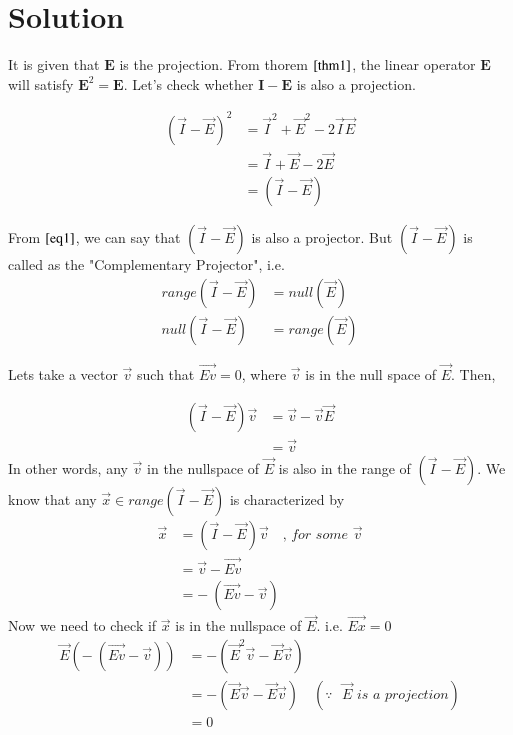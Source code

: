 \documentclass[journal,12pt,twocolumn]{IEEEtran}
\begin{document}
	\section{\textbf{Solution}}
	
	It is given that $\mathbf{E}$ is the projection. From thorem $\ref{thm1}$, the linear operator $\mathbf{E}$ will satisfy $\mathbf{E}^{2} = \mathbf{E}$. Let's check whether $\mathbf{I-E}$ is also a projection. 
	
	\begin{align}\label{eq1}
		(\Vec{I}-\vec{E})^{2} &= \Vec{I}^{2} + \Vec{E}^{2} - 2\Vec{I}\Vec{E} \nonumber \\
		&= \Vec{I} + \Vec{E} - 2\Vec{E} \nonumber \\
		&= (\Vec{I} - \Vec{E})
	\end{align}
	
	From $\eqref{eq1}$, we can say that $(\Vec{I} - \Vec{E})$ is also a projector. But $(\Vec{I} - \Vec{E})$ is called as the "Complementary Projector", i.e.
	\begin{align}
		range(\Vec{I} - \Vec{E}) &= null(\Vec{E}) \label{eq2}\\
		null(\Vec{I} - \Vec{E}) &= range(\Vec{E}) \label{eq3}
	\end{align}
	
	Lets take a vector $\Vec{v}$ such that $\Vec{Ev} = 0$, where $\vec{v}$ is in the null space of $\vec{E}$. Then, 
	
	\begin{align}
		(\Vec{I} - \Vec{E})\vec{v} &= \vec{v} - \vec{v}\vec{E} \nonumber \\
		&= \vec{v}
	\end{align}
	In other words, any $\Vec{v}$ in the nullspace of $\Vec{E}$ is also in the range of $(\Vec{I} - \Vec{E})$.  
	We know that any $\vec{x} \in range(\Vec{I} - \Vec{E})$ is characterized by
	\begin{align}
		\Vec{x} &= (\Vec{I} - \Vec{E})\Vec{v} \quad \textit{, for some $\Vec{v}$} \nonumber \\
		&= \Vec{v} - \Vec{Ev} \nonumber \\
		&= - \ (\Vec{Ev} - \Vec{v})
	\end{align}
	Now we need to check if $\Vec{x}$ is in the nullspace of $\Vec{E}$. i.e. $\Vec{Ex} = 0$
	\begin{align}
		\Vec{E}(- \ (\Vec{Ev} - \Vec{v})) &= -(\Vec{E}^{2}\Vec{v} - \Vec{E}\Vec{v}) \nonumber \\
		&= -(\Vec{E}\Vec{v} - \Vec{E}\Vec{v}) \quad (\textit{$\because$ $\vec{E}$ is a projection}) \nonumber \\
		&= 0
	\end{align}
	
\end{document}
